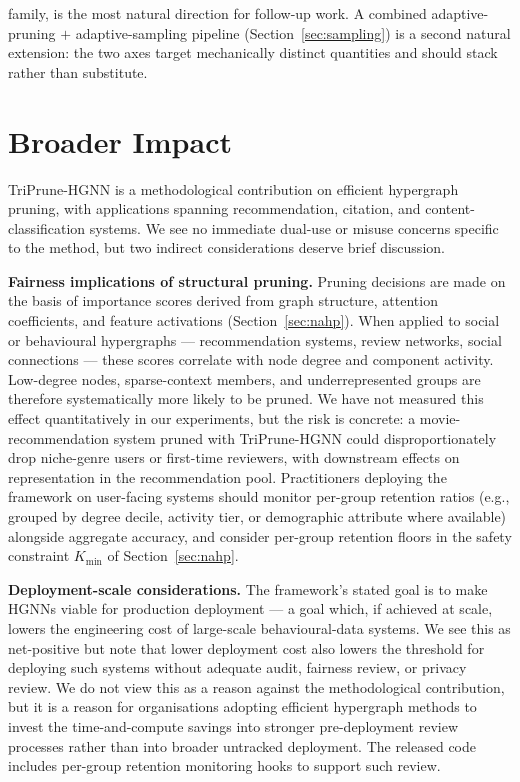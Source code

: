\documentclass[10pt]{article}
\theoremstyle{plain}
\theoremstyle{definition}
\begin{document}
family, is the most natural direction for follow-up work. A combined adaptive-pruning $+$ adaptive-sampling pipeline (Section~\ref{sec:sampling}) is a second natural extension: the two axes target mechanically distinct quantities and should stack rather than substitute.

\section*{Broader Impact}
\label{sec:impact}
 
TriPrune-HGNN is a methodological contribution on efficient hypergraph pruning, with applications spanning recommendation, citation, and content-classification systems. We see no immediate dual-use or misuse concerns specific to the method, but two indirect considerations deserve brief discussion.
 
\textbf{Fairness implications of structural pruning.} Pruning decisions are made on the basis of importance scores derived from graph structure, attention coefficients, and feature activations (Section~\ref{sec:nahp}). When applied to social or behavioural hypergraphs --- recommendation systems, review networks, social connections --- these scores correlate with node degree and component activity. Low-degree nodes, sparse-context members, and underrepresented groups are therefore systematically more likely to be pruned. We have not measured this effect quantitatively in our experiments, but the risk is concrete: a movie-recommendation system pruned with TriPrune-HGNN could disproportionately drop niche-genre users or first-time reviewers, with downstream effects on representation in the recommendation pool. Practitioners deploying the framework on user-facing systems should monitor per-group retention ratios (e.g., grouped by degree decile, activity tier, or demographic attribute where available) alongside aggregate accuracy, and consider per-group retention floors in the safety constraint $K_{\min}$ of Section~\ref{sec:nahp}.
 
\textbf{Deployment-scale considerations.} The framework's stated goal is to make HGNNs viable for production deployment --- a goal which, if achieved at scale, lowers the engineering cost of large-scale behavioural-data systems. We see this as net-positive but note that lower deployment cost also lowers the threshold for deploying such systems without adequate audit, fairness review, or privacy review. We do not view this as a reason against the methodological contribution, but it is a reason for organisations adopting efficient hypergraph methods to invest the time-and-compute savings into stronger pre-deployment review processes rather than into broader untracked deployment. The released code includes per-group retention monitoring hooks to support such review.
\end{document}

